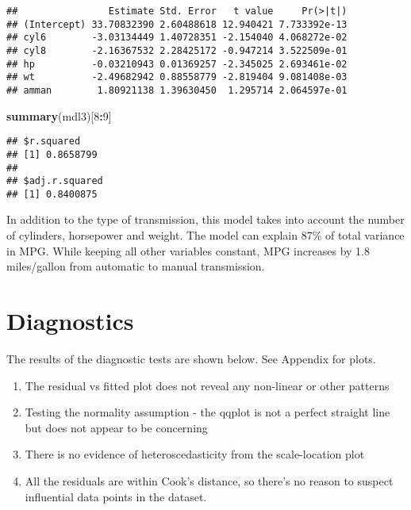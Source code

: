 \documentclass[
]{article}
\newenvironment{Shaded}{\begin{snugshade}}{\end{snugshade}}
\newcommand{\DataTypeTok}[1]{\textcolor[rgb]{0.13,0.29,0.53}{#1}}
\newcommand{\DecValTok}[1]{\textcolor[rgb]{0.00,0.00,0.81}{#1}}
\newcommand{\KeywordTok}[1]{\textcolor[rgb]{0.13,0.29,0.53}{\textbf{#1}}}
\newcommand{\NormalTok}[1]{#1}
\newcommand{\OperatorTok}[1]{\textcolor[rgb]{0.81,0.36,0.00}{\textbf{#1}}}
\newcommand{\StringTok}[1]{\textcolor[rgb]{0.31,0.60,0.02}{#1}}
\providecommand{\tightlist}{%
  \setlength{\itemsep}{0pt}\setlength{\parskip}{0pt}}
\begin{document}
\begin{Shaded}
\end{Shaded}

\begin{verbatim}
##                Estimate Std. Error   t value     Pr(>|t|)
## (Intercept) 33.70832390 2.60488618 12.940421 7.733392e-13
## cyl6        -3.03134449 1.40728351 -2.154040 4.068272e-02
## cyl8        -2.16367532 2.28425172 -0.947214 3.522509e-01
## hp          -0.03210943 0.01369257 -2.345025 2.693461e-02
## wt          -2.49682942 0.88558779 -2.819404 9.081408e-03
## amman        1.80921138 1.39630450  1.295714 2.064597e-01
\end{verbatim}

\begin{Shaded}
\begin{Highlighting}[]
\KeywordTok{summary}\NormalTok{(mdl3)[}\DecValTok{8}\OperatorTok{:}\DecValTok{9}\NormalTok{]}
\end{Highlighting}
\end{Shaded}

\begin{verbatim}
## $r.squared
## [1] 0.8658799
## 
## $adj.r.squared
## [1] 0.8400875
\end{verbatim}

In addition to the type of transmission, this model takes into account
the number of cylinders, horsepower and weight. The model can explain
87\% of total variance in MPG. While keeping all other variables
constant, MPG increases by 1.8 miles/gallon from automatic to manual
transmission.

\hypertarget{diagnostics}{%
\section{Diagnostics}\label{diagnostics}}

The results of the diagnostic tests are shown below. See Appendix for
plots.

\begin{enumerate}
\def\labelenumi{\arabic{enumi}.}
\tightlist
\item
  The residual vs fitted plot does not reveal any non-linear or other
  patterns
\item
  Testing the normality assumption - the qqplot is not a perfect
  straight line but does not appear to be concerning
\item
  There is no evidence of heteroscedasticity from the scale-location
  plot
\item
  All the residuals are within Cook's distance, so there's no reason to
  suspect influential data points in the dataset.
\end{enumerate}
\end{document}
